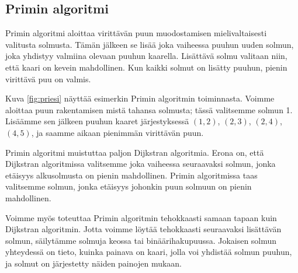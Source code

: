 \subsection{Primin algoritmi}

Primin algoritmi aloittaa virittävän puun muodostamisen
mielivaltaisesti valitusta solmusta.
Tämän jälkeen se lisää joka vaiheessa puuhun uuden solmun,
joka yhdistyy valmiina olevaan puuhun kaarella.
Lisättävä solmu valitaan niin, että kaari on kevein mahdollinen.
Kun kaikki solmut on lisätty puuhun, pienin virittävä puu on valmis.

Kuva \ref{fig:priesi} näyttää esimerkin Primin algoritmin toiminnasta.
Voimme aloittaa puun rakentamisen mistä tahansa solmusta;
tässä valitsemme solmun 1.
Lisäämme sen jälkeen puuhun kaaret järjestyksessä
$(1,2)$, $(2,3)$, $(2,4)$, $(4,5)$, ja saamme aikaan pienimmän
virittävän puun.

Primin algoritmi muistuttaa paljon Dijkstran algoritmia.
Erona on, että Dijkstran algoritmissa valitsemme joka vaiheessa
seuraavaksi solmun, jonka etäisyys alkusolmusta on pienin
mahdollinen.
Primin algoritmissa taas valitsemme solmun, jonka etäisyys
johonkin puun solmuun on pienin mahdollinen.

Voimme myös toteuttaa Primin algoritmin tehokkaasti samaan
tapaan kuin Dijkstran algoritmin.
Jotta voimme löytää tehokkaasti seuraavaksi lisät\-tävän solmun,
säilytämme solmuja keossa tai binäärihakupuussa.
Jokaisen solmun yhteydessä on tieto, kuinka painava on kaari,
jolla voi yhdistää solmun puuhun, ja solmut on järjestetty
näiden painojen mukaan.

